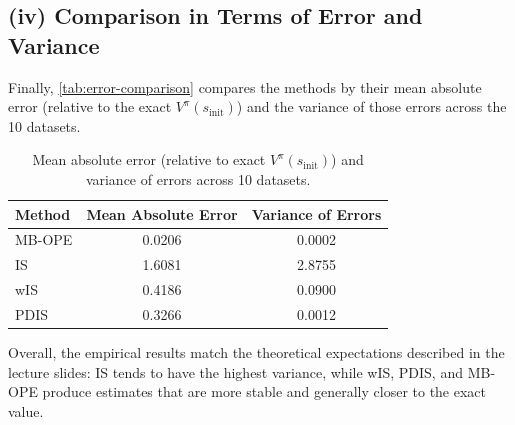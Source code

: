 \subsection*{(iv) Comparison in Terms of Error and Variance}
Finally, \autoref{tab:error-comparison} compares the methods by their mean absolute error (relative to the exact $V^\pi(s_{\text{init}})$) and the variance of those errors across the 10 datasets.
\begin{table}[H]
\centering
\begin{tabular}{l|cc}
\hline
\textbf{Method} & \textbf{Mean Absolute Error} & \textbf{Variance of Errors} \\
\hline
MB-OPE & 0.0206 & 0.0002 \\
IS     & 1.6081 & 2.8755 \\
wIS    & 0.4186 & 0.0900 \\
PDIS   & 0.3266 & 0.0012 \\
\hline
\end{tabular}
\caption{Mean absolute error (relative to exact $V^\pi(s_{\text{init}})$) and variance of errors across 10 datasets.}
\label{tab:error-comparison}
\end{table}

Overall, the empirical results match the theoretical expectations described in the lecture slides: IS tends to have the highest variance, while wIS, PDIS, and MB-OPE produce estimates that are more stable and generally closer to the exact value.

